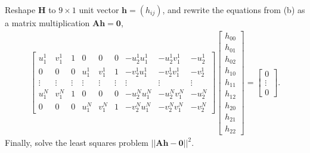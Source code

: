 \documentclass[a4paper,10pt]{article}
\begin{document}
Reshape $\bm{H}$ to $9 \times 1$ unit vector $\bm{h} = (h_{ij})$, and
rewrite the equations from (b) as a matrix multiplication $\bm{A} \bm{h} = \bm{0}$,
\begin{align*}
\begin{bmatrix}
u_1^1 & v_1^1 & 1 & 0 & 0 & 0 & -u_2^1 u_1^1 & -u_2^1 v_1^1 & -u_2^1 \\
0 & 0 & 0 & u_1^1 & v_1^1 & 1 & -v_2^1 u_1^1 & -v_2^1 v_1^1 & -v_2^1 \\
\vdots & \vdots & \vdots & \vdots & \vdots & \vdots & \vdots & \vdots & \vdots \\
u_1^N & v_1^N & 1 & 0 & 0 & 0 & -u_2^N u_1^N & -u_2^N v_1^N & -u_2^N \\
0 & 0 & 0 & u_1^N & v_1^N & 1 & -v_2^N u_1^N & -v_2^N v_1^N & -v_2^N
\end{bmatrix}
\begin{bmatrix}
h_{00} \\
h_{01} \\
h_{02} \\
h_{10} \\
h_{11} \\
h_{12} \\
h_{20} \\
h_{21} \\
h_{22}
\end{bmatrix}
=
\begin{bmatrix}
0 \\
\vdots \\
0
\end{bmatrix}.
\end{align*}
Finally, solve the least squares problem $||\bm{A} \bm{h} - \bm{0}||^2$.
\end{document}
